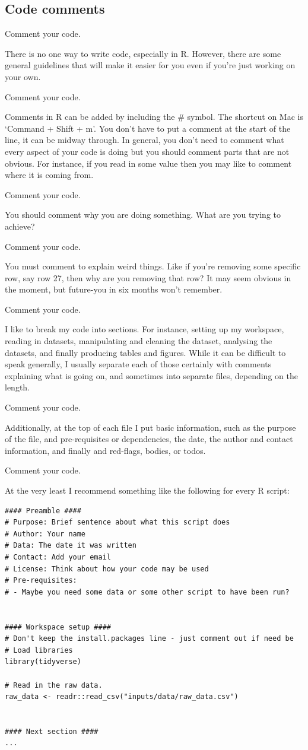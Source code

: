 \documentclass[
]{book}
\begin{document}
\hypertarget{code-comments}{%
\subsection{Code comments}\label{code-comments}}

Comment your code.

There is no one way to write code, especially in R. However, there are some general guidelines that will make it easier for you even if you're just working on your own.

Comment your code.

Comments in R can be added by including the \# symbol. The shortcut on Mac is `Command + Shift + m'. You don't have to put a comment at the start of the line, it can be midway through. In general, you don't need to comment what every aspect of your code is doing but you should comment parts that are not obvious. For instance, if you read in some value then you may like to comment where it is coming from.

Comment your code.

You should comment why you are doing something. What are you trying to achieve?

Comment your code.

You must comment to explain weird things. Like if you're removing some specific row, say row 27, then why are you removing that row? It may seem obvious in the moment, but future-you in six months won't remember.

Comment your code.

I like to break my code into sections. For instance, setting up my workspace, reading in datasets, manipulating and cleaning the dataset, analysing the datasets, and finally producing tables and figures. While it can be difficult to speak generally, I usually separate each of those certainly with comments explaining what is going on, and sometimes into separate files, depending on the length.

Comment your code.

Additionally, at the top of each file I put basic information, such as the purpose of the file, and pre-requisites or dependencies, the date, the author and contact information, and finally and red-flags, bodies, or todos.

Comment your code.

At the very least I recommend something like the following for every R script:

\begin{verbatim}
#### Preamble ####
# Purpose: Brief sentence about what this script does
# Author: Your name
# Data: The date it was written
# Contact: Add your email
# License: Think about how your code may be used
# Pre-requisites: 
# - Maybe you need some data or some other script to have been run?


#### Workspace setup ####
# Don't keep the install.packages line - just comment out if need be
# Load libraries
library(tidyverse)

# Read in the raw data. 
raw_data <- readr::read_csv("inputs/data/raw_data.csv")


#### Next section ####
...
\end{verbatim}
\end{document}
